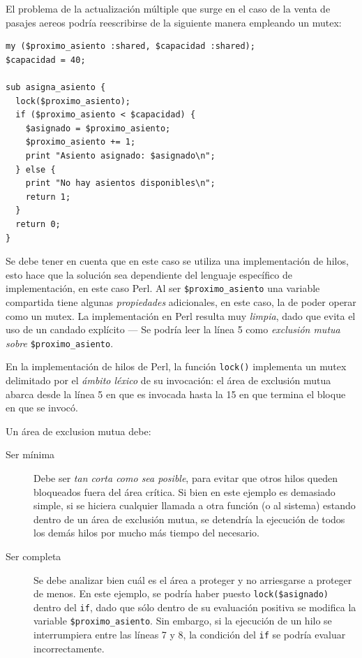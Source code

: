 \documentclass[11pt,fleqn]{book} %
\begin{document}
El problema de la actualización múltiple que surge en el caso de la
venta de pasajes aereos podría reescribirse de la siguiente manera
empleando un mutex:


\begin{verbatim}
my ($proximo_asiento :shared, $capacidad :shared);
$capacidad = 40;

sub asigna_asiento {
  lock($proximo_asiento);
  if ($proximo_asiento < $capacidad) {
    $asignado = $proximo_asiento;
    $proximo_asiento += 1;
    print "Asiento asignado: $asignado\n";
  } else {
    print "No hay asientos disponibles\n";
    return 1;
  }
  return 0;
}
\end{verbatim}

Se debe tener en cuenta que en este caso se utiliza una implementación
de hilos, esto hace que la solución sea dependiente del lenguaje
específico de implementación, en este caso Perl. Al ser
\texttt{\$proximo\_asiento} una variable compartida tiene algunas \emph{propiedades}
adicionales, en este caso, la de poder operar como un mutex. La
implementación en Perl resulta muy \emph{limpia}, dado que evita el uso
de un candado explícito — Se podría leer la línea 5 como \emph{exclusión mutua sobre} \texttt{\$proximo\_asiento}.

En la implementación de hilos de Perl, la función \texttt{lock()} implementa
un mutex delimitado por el \emph{ámbito léxico} de su invocación: el área
de exclusión mutua abarca desde la línea 5 en que es invocada hasta la
15 en que termina el bloque en que se invocó.

Un área de exclusion mutua debe:

\begin{description}
\item[Ser mínima] Debe ser \emph{tan corta como sea posible}, para evitar que
                otros hilos queden bloqueados fuera del área
                crítica. Si bien en este ejemplo es demasiado simple,
                si se hiciera cualquier llamada a otra función (o al
                sistema) estando dentro de un área de exclusión mutua,
                se detendría la ejecución de todos los demás hilos por
                mucho más tiempo del necesario.
\item[Ser completa] Se debe analizar bien cuál es el área a
     proteger y no arriesgarse a proteger de menos. En este ejemplo,
     se podría haber puesto \texttt{lock(\$asignado)} dentro del \texttt{if}, dado
     que sólo dentro de su evaluación positiva se modifica la variable
     \texttt{\$proximo\_asiento}. Sin embargo, si la ejecución de un hilo se
     interrumpiera entre las líneas 7 y 8, la condición del \texttt{if} se
     podría evaluar incorrectamente.
\end{description}
\end{document}
